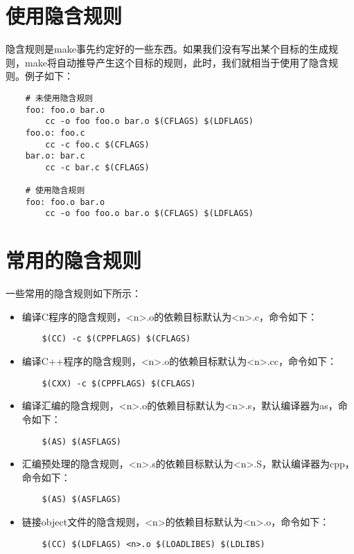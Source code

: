 \documentclass[a4paper,left=2.5cm,right=2.5cm,11pt]{article}
\begin{document}
\tableofcontents

\clearpage

\section{使用隐含规则}
	隐含规则是make事先约定好的一些东西。如果我们没有写出某个目标的生成规则，make将自动推导产生这个目标的规则，此时，我们就相当于使用了隐含规则。例子如下：
	\begin{lstlisting}
	# 未使用隐含规则
	foo: foo.o bar.o
		cc -o foo foo.o bar.o $(CFLAGS) $(LDFLAGS)
	foo.o: foo.c
		cc -c foo.c $(CFLAGS)
	bar.o: bar.c
		cc -c bar.c $(CFLAGS)

	# 使用隐含规则
	foo: foo.o bar.o
		cc -o foo foo.o bar.o $(CFLAGS) $(LDFLAGS)
	\end{lstlisting}

\section{常用的隐含规则}
	一些常用的隐含规则如下所示：
	\begin{itemize}
		\item 编译C程序的隐含规则，<n>.o的依赖目标默认为<n>.c，命令如下：
		\begin{lstlisting}
	$(CC) -c $(CPPFLAGS) $(CFLAGS)
		\end{lstlisting}

		\item 编译C++程序的隐含规则，<n>.o的依赖目标默认为<n>.cc，命令如下：
		\begin{lstlisting}
	$(CXX) -c $(CPPFLAGS) $(CFLAGS)
		\end{lstlisting}

		\item 编译汇编的隐含规则，<n>.o的依赖目标默认为<n>.s，默认编译器为as，命令如下：
		\begin{lstlisting}
	$(AS) $(ASFLAGS)
		\end{lstlisting}

		\item 汇编预处理的隐含规则，<n>.s的依赖目标默认为<n>.S，默认编译器为cpp，命令如下：
		\begin{lstlisting}
	$(AS) $(ASFLAGS)
		\end{lstlisting}

		\item 链接object文件的隐含规则，<n>的依赖目标默认为<n>.o，命令如下：
		\begin{lstlisting}
	$(CC) $(LDFLAGS) <n>.o $(LOADLIBES) $(LDLIBS)
		\end{lstlisting}
	\end{itemize}
\end{document}
